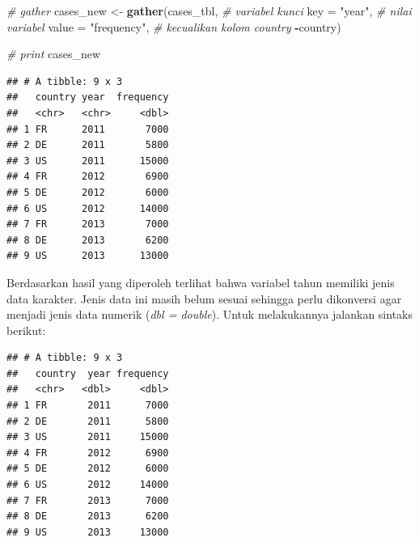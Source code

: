 \documentclass[]{book}
\newenvironment{Shaded}{\begin{snugshade}}{\end{snugshade}}
\newcommand{\KeywordTok}[1]{\textcolor[rgb]{0.13,0.29,0.53}{\textbf{#1}}}
\newcommand{\DataTypeTok}[1]{\textcolor[rgb]{0.13,0.29,0.53}{#1}}
\newcommand{\StringTok}[1]{\textcolor[rgb]{0.31,0.60,0.02}{#1}}
\newcommand{\CommentTok}[1]{\textcolor[rgb]{0.56,0.35,0.01}{\textit{#1}}}
\newcommand{\OperatorTok}[1]{\textcolor[rgb]{0.81,0.36,0.00}{\textbf{#1}}}
\newcommand{\NormalTok}[1]{#1}
\begin{document}
\begin{Shaded}
\begin{Highlighting}[]
\CommentTok{# gather}
\NormalTok{cases_new <-}\StringTok{ }\KeywordTok{gather}\NormalTok{(cases_tbl, }
                    \CommentTok{# variabel kunci}
                    \DataTypeTok{key =} \StringTok{"year"}\NormalTok{,}
                    \CommentTok{# nilai variabel}
                    \DataTypeTok{value =} \StringTok{"frequency"}\NormalTok{,}
                    \CommentTok{# kecualikan kolom country}
                    \OperatorTok{-}\NormalTok{country)}

\CommentTok{# print}
\NormalTok{cases_new}
\end{Highlighting}
\end{Shaded}

\begin{verbatim}
## # A tibble: 9 x 3
##   country year  frequency
##   <chr>   <chr>     <dbl>
## 1 FR      2011       7000
## 2 DE      2011       5800
## 3 US      2011      15000
## 4 FR      2012       6900
## 5 DE      2012       6000
## 6 US      2012      14000
## 7 FR      2013       7000
## 8 DE      2013       6200
## 9 US      2013      13000
\end{verbatim}

Berdasarkan hasil yang diperoleh terlihat bahwa variabel tahun memiliki
jenis data karakter. Jenis data ini masih belum sesuai sehingga perlu
dikonversi agar menjadi jenis data numerik (\emph{dbl = double}). Untuk
melakukannya jalankan sintaks berikut:

\begin{Shaded}
\end{Shaded}

\begin{verbatim}
## # A tibble: 9 x 3
##   country  year frequency
##   <chr>   <dbl>     <dbl>
## 1 FR       2011      7000
## 2 DE       2011      5800
## 3 US       2011     15000
## 4 FR       2012      6900
## 5 DE       2012      6000
## 6 US       2012     14000
## 7 FR       2013      7000
## 8 DE       2013      6200
## 9 US       2013     13000
\end{verbatim}
\end{document}
